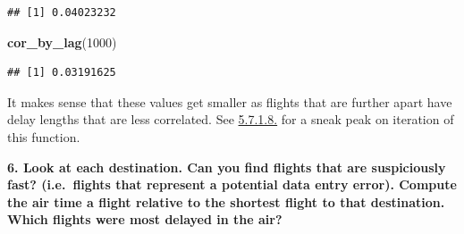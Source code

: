 \documentclass[]{book}
\newenvironment{Shaded}{\begin{snugshade}}{\end{snugshade}}
\newcommand{\DataTypeTok}[1]{\textcolor[rgb]{0.13,0.29,0.53}{#1}}
\newcommand{\DecValTok}[1]{\textcolor[rgb]{0.00,0.00,0.81}{#1}}
\newcommand{\KeywordTok}[1]{\textcolor[rgb]{0.13,0.29,0.53}{\textbf{#1}}}
\newcommand{\NormalTok}[1]{#1}
\newcommand{\OperatorTok}[1]{\textcolor[rgb]{0.81,0.36,0.00}{\textbf{#1}}}
\newcommand{\StringTok}[1]{\textcolor[rgb]{0.31,0.60,0.02}{#1}}
\theoremstyle{definition}
\theoremstyle{definition}
\theoremstyle{definition}
\theoremstyle{remark}
\begin{document}
\begin{verbatim}
## [1] 0.04023232
\end{verbatim}

\begin{Shaded}
\begin{Highlighting}[]
\KeywordTok{cor_by_lag}\NormalTok{(}\DecValTok{1000}\NormalTok{)}
\end{Highlighting}
\end{Shaded}

\begin{verbatim}
## [1] 0.03191625
\end{verbatim}

It makes sense that these values get smaller as flights that are further
apart have delay lengths that are less correlated. See
\protect\hyperlink{section-20}{5.7.1.8.} for a sneak peak on iteration
of this function.

\textbf{6. Look at each destination. Can you find flights that are
suspiciously fast? (i.e.~flights that represent a potential data entry
error). Compute the air time a flight relative to the shortest flight to
that destination. Which flights were most delayed in the air?}

\begin{Shaded}
\end{Shaded}
\end{document}
